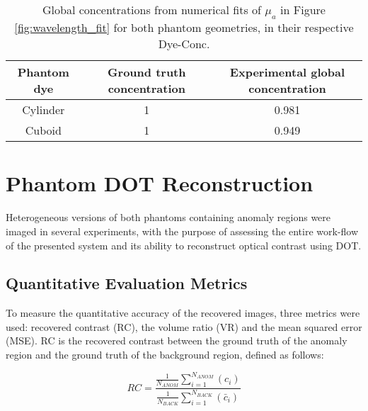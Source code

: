 \documentclass[twoside]{bhamthesis}
\theoremstyle{definition}
\begin{document}
\bgroup
\def\arraystretch{1.2}
\begin{table}[!ht]
\small
\begin{center}
 \begin{tabular}{c c c} 
 \hline
 Phantom dye & Ground truth concentration & Experimental global concentration \\  
 \hline
 Cylinder & 1 & 0.981 \\
 Cuboid & 1 &  0.949 \\
 \hline
\end{tabular}
\caption{Global concentrations from numerical fits of $\mu_a$ in Figure \ref{fig:wavelength_fit} for both phantom geometries, in their respective Dye-Conc.}
\label{tab:PhantomOpticalPropertiesTable}
\end{center}
\end{table}
\egroup



\section{Phantom DOT Reconstruction}

Heterogeneous versions of both phantoms containing anomaly regions were imaged in several experiments, with the purpose of assessing the entire work-flow of the presented system and its ability to reconstruct optical contrast using DOT.

\subsection{Quantitative Evaluation Metrics}

\label{Evaluation Metrics}

To measure the quantitative accuracy of the recovered images, three metrics were used: recovered contrast (RC), the volume ratio (VR) and the mean squared error (MSE). RC is the recovered contrast between the ground truth of the anomaly region and the ground truth of the background region, defined as follows:

\begin{equation}
\label{eq:Recovered contrast}
RC= \frac{\frac{1}{N_{ANOM}}\sum_{i=1}^{N_{ANOM}}\left(c_i\right)}{\frac{1}{N_{BACK}}\sum_{i=1}^{N_{BACK}}\left(\bar{c}_i\right)}
\end{equation}
\end{document}
